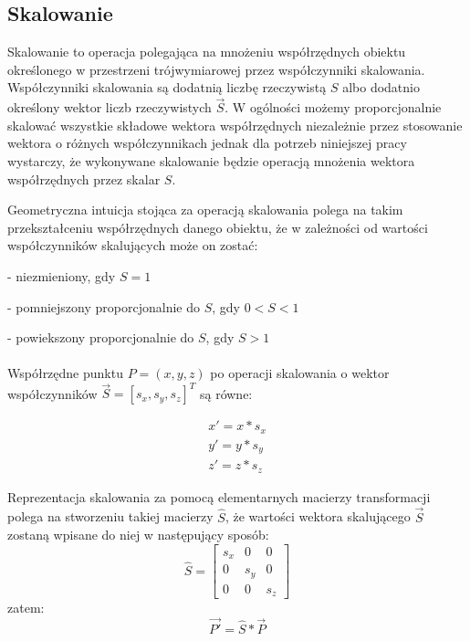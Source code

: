 \documentclass[licencjacka]{pracamgr}
\begin{document}
\fi

\subsection{Skalowanie}
Skalowanie to operacja polegająca na mnożeniu współrzędnych obiektu określonego w przestrzeni trójwymiarowej przez współczynniki skalowania. Współczynniki skalowania są dodatnią liczbę rzeczywistą $S$ albo dodatnio określony wektor liczb rzeczywistych $\vec{S}$. W ogólności możemy proporcjonalnie skalować wszystkie składowe wektora współrzędnych niezależnie przez stosowanie wektora o różnych współczynnikach jednak dla potrzeb niniejszej pracy wystarczy, że wykonywane skalowanie będzie operacją mnożenia wektora współrzędnych przez skalar $S$.

Geometryczna intuicja stojąca za operacją skalowania polega na takim przekształceniu współrzędnych danego obiektu, że w zależności od wartości współczynników skalujących może on zostać: 

- niezmieniony, gdy $S=1$

- pomniejszony proporcjonalnie do $S$, gdy $0<S<1$

- powiekszony proporcjonalnie do $S$, gdy $S>1$
\\
\\
Współrzędne punktu $P=(x,y,z)$ po operacji skalowania o wektor współczynników $\vec{S}=[s_x,s_y,s_z]^T$ są równe:

$$
\begin{array}{lr}
x'=x*s_x \\
y'=y*s_y \\
z'=z*s_z
\end{array}
$$

Reprezentacja skalowania za pomocą elementarnych macierzy transformacji polega na stworzeniu takiej macierzy $\hat{S}$, że wartości wektora skalującego $\vec{S}$ zostaną wpisane do niej w następujący sposób:
$$
\hat{S}
=
\begin{bmatrix}
s_x & 0 & 0 \\
0 & s_y & 0 \\
0 & 0 & s_z
\end{bmatrix}
$$
zatem:
$$
\vec{P'}=\hat{S}*\vec{P}
$$
\end{document}
